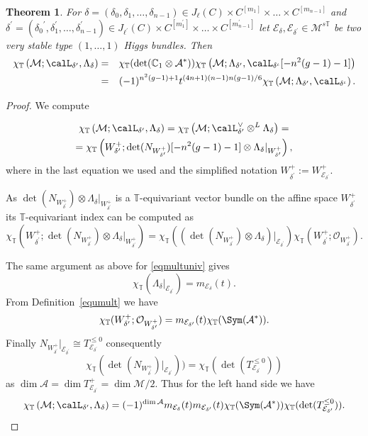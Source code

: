 \documentclass[12pt]{article}
\numberwithin{equation}{section}
\newtheorem{theorem}{Theorem}
\theoremstyle{remark}
\theoremstyle{definition}
\numberwithin{theorem}{section}
\def\beq{\begin{eqnarray}}
\def\eeq{\end{eqnarray}}
\def\bes{\begin{eqnarray*}}
\def\ees{\end{eqnarray*}}
\def\ddelta{{{\delta}}}
\def\calE{{\mathcal E}}
\def\C{\mathbb{C}}
\def\M{{\mathcal{M}}}
\def\calA{{\mathcal{A}}}
\newcommand{\T}{{\mathbb{T}}}
\def\calO{{\mathcal O}}
\def\Z{\mathbb{Z}}
\def\d{{{\delta}}}
\renewcommand{\1}{\mathbbm{1}}
\begin{document}
\begin{theorem} \label{euleriso} For $\ddelta=(\delta_0,\delta_1,\dots,\delta_{n-1})\in J_{{\ell}}(C)\times C^{[m_1]}\times \dots \times C^{[m_{n-1}]}$ and $\ddelta^\prime=({\delta_0}^\prime,\delta^\prime_1,\dots,\delta^\prime_{n-1})\in J_{{\ell^\prime}}(C)\times C^{[m^\prime_1]}\times \dots \times C^{[m^\prime_{n-1}]}$  let $\calE_{\ddelta}, \calE_{\ddelta^\prime}\in \M^{s\T}$ be two very stable type $(1,\dots,1)$ Higgs bundles. Then \bes \chi_\T\left(\M;\calL_{\ddelta^\prime},\Lambda_{\ddelta}\right)&=&\chi_\T(\det(\C_{1}\otimes\calA^*)) \chi_\T\left(\M;\Lambda_{\ddelta^\prime},\calL_{\ddelta^\iota}[-n^2(g-1)-1]
	\right)
	\\ &= &(-1)^{n^2(g-1)+1} t^{(4n+1)(n-1)n(g-1)/6}  \chi_\T\left(\M;\Lambda_{\ddelta^\prime},\calL_{\ddelta^\iota}\right).\ees
	
\end{theorem}   	\begin{proof} We compute
	
	\begin{multline*} \chi_\T\left(\M;\calL_{\ddelta^\prime},\Lambda_{\ddelta}\right)= \chi_\T\left(\M;\calL_{\ddelta^\prime}^\vee \otimes ^L \Lambda_{\ddelta}\right)=\\ = \chi_\T\left(W^+_{\d^\prime};\det(N_{W^+_{\d^\prime}})[-n^2(g-1)-1] \otimes \Lambda_{\ddelta}|_{W^+_{\d^\prime}}\right),\end{multline*} where in the last equation we used \cite[Corollary 3.40]{huybrechts} and the simplified notation $W^+_{\d^\prime}:=W^+_{\calE_{\d^\prime}}$.
	
	As $\det(N_{W^+_{\d^\prime}}) \otimes \Lambda_{\ddelta}|_{W^+_{\d^\prime}}$ is a $\T$-equivariant vector bundle on the  affine space $W^+_{\d^\prime}$ its $\T$-equivariant index can be computed as $$\chi_\T\left(W^+_{\d^\prime};\det(N_{W^+_{\d^\prime}}) \otimes \Lambda_{\ddelta}|_{W^+_{\d^\prime}}\right)=\chi_\T\left((\det(N_{W^+_{\d^\prime}}) \otimes \Lambda_{\ddelta})|_{{\calE_{\d^\prime}}}\right) \chi_\T(W^+_{\d^\prime};\calO_{W^+_{\d^\prime}}).$$
	
	The same argument as above for \eqref{eqmultuniv} gives  $$\chi_\T(\Lambda_{\d}|_{\calE_{\d^\prime}})=m_{\calE_{\d}}(t).$$ From Definition~\ref{equmult} we have $$\chi_\T(W^+_{\d^\prime};\calO_{W^+_{\d^\prime}})=m_{\calE_{\d^\prime}}(t)\chi_\T(\Sym(\calA^*)).$$ Finally $N_{W^+_{\d^\prime}}|_{\calE_{\d^\prime}}\cong T^{\leq  0} _{\calE_{\d^\prime}}$ %
	consequently $$\chi_\T(\det(N_{W^+_{\d^\prime}})|_{{\calE_{\d^\prime}}}))= \chi_\T(\det(T^{\leq  0}_{\calE_{\d^\prime}}))$$  as $\dim \calA = \dim T^+_{\calE_{\d^\prime}}=\dim \M/2$. Thus for the left hand side we have 
	\beq \label{lhs}	\chi_\T\left(\M;\calL_{\ddelta^\prime},\Lambda_{\ddelta}\right)=(-1)^{\dim \cal A}m_{\calE_{\d}}(t)m_{\calE_{\d^\prime}}(t)\chi_\T(\Sym(\calA^*))\chi_\T(\det(T^{\leq  0}_{\calE_{\d^\prime}})).\eeq
	

\end{proof}
\end{document}
